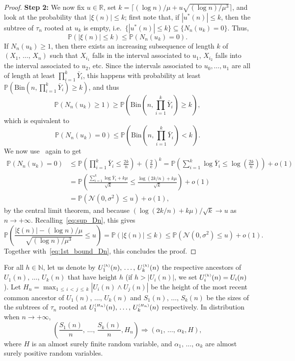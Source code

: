 \documentclass[AHL,Unicode,longabstracts,published]{cedram}
\newcommand{\sss}{\ensuremath{\scriptscriptstyle}}
\newcommand{\bbP}{\mathbb{P}}
\newcommand{\bbN}{\mathbb{N}}
\newcommand{\bbR}{\mathbb{R}}
\newcommand{\clN}{\mathcal{N}}
\newcommand{\Bin}{\mathrm{Bin}}
\newcommand{\rme}{\mathrm{e}}
\begin{document}
\begin{proof}
{\bf Step 2:} We now fix $u\in\bbR$, set $k = \lceil(\log n)/\mu + u\sqrt{(\log n)/\mu^3}\rceil$, and look at the probability that $|\xi(n)|\leq k$; first note that, if $|u^*(n)| \leq k$, then the subtree of $\tau_n$ rooted at $u_k$ is empty, i.e.\ $\{|u^*(n)|\leq k\}\subseteq \{N_n(u_k)=0\}$. Thus,
\begin{equation}\label{eq:sup_Dn}
\bbP(|\xi(n)|\leq k)\leq \bbP(N_n(u_k)=0).
\end{equation}
If $N_n(u_k) \geq 1$, then there exists an increasing subsequence of length $k$ of $(X_1, \,\ldots,\, X_n)$ such that $X_{i_1}$ falls in the interval associated to $u_1$, $X_{i_2}$ falls into the interval associated to $u_2$, etc. Since the intervals associated to $u_0, \ldots, u_1$ are all of length at least $\prod_{i=1}^k \bar Y_i$, this happens with probability at least $\bbP(\Bin(n,\prod_{i=1}^k \bar Y_i)\geq k)$, and thus
\[
\bbP(N_n(u_k)\geq 1)
\geq \bbP\left(\Bin\left(n,\prod_{i=1}^k \bar Y_i\right)\geq k\right),
\]
which is equivalent to
\[
\bbP(N_n(u_k)=0) \leq \bbP\left(\Bin\left(n,\prod_{i=1}^k \bar Y_i\right)< k\right).
\]
We now use~\cite[Lemma~4]{devroye-split} again to get
\begin{align*}
\bbP(N_n(u_k)=0) &\leq \bbP\left(\prod_{i=1}^k \bar Y_i\leq \frac{2k}n\right)+\left(\frac2{\rme}\right)^k =\bbP\left(\sum_{i=1}^k \log \bar Y_i\leq \log\left(\frac{2k}n\right)\right)+o(1)\\
&= \bbP\left(\frac{\sum_{i=1}^k \log \bar Y_i+k\mu}{\sqrt{k}}\leq \frac{\log(2k/n)+k\mu}{\sqrt k}\right)+o(1)\\
&=\bbP(\clN(0,\sigma^2)\leq u)+o(1),
\end{align*}
by the central limit theorem, and because $(\log(2k/n)+k\mu)/\sqrt k\to u$ as $n\to+\infty$. Recalling~\eqref{eq:sup_Dn}, this gives
\[
\bbP\left(\frac{|\xi(n)|-(\log n)/\mu}{\sqrt{(\log n)/\mu^3}}\leq u\right)=\bbP(|\xi(n)|\leq k)
\leq \bbP(\clN(0,\sigma^2)\leq u)+o(1).
\]
Together with~\eqref{eq:1st_bound_Dn}, this concludes the proof.
\end{proof}

\begin{lemm}\label{lem:LCA}
For all $h\in \bbN$, let us denote by $U^{\sss (h)}_1(n), \,\ldots,\, U^{\sss (h)}_k(n)$ the respective ancestors of $U_1(n), \,\ldots,\, U_k(n)$ that have height $h$ (if $h>|U_i(n)|$, we set $U^{\sss (h)}_i(n)=U_i(n)$). Let $H_n=\max_{1\,\le\,i\,<\,j\,\le\,k} |U_i(n)\wedge U_j(n)|$ be the height of the most recent common ancestor of $U_1(n),\,\dots,\,U_k(n)$ and $S_1(n), \,\ldots, \,S_k(n)$ be the sizes of the subtrees of $\tau_n$ rooted at $U_1^{\sss (H_n)}(n), \,\ldots,\, U_k^{\sss (H_n)}(n)$ respectively. In distribution when $n\to+\infty$,
\[
\left(\frac{S_1(n)}n, \,\ldots,\, \frac{S_k(n)}n, H_n\right)
\Rightarrow (\alpha_1, \,\ldots,\, \alpha_k, H),
\]
where $H$ is an almost surely finite random variable, and $\alpha_1,\, \ldots,\, \alpha_k$ are almost surely positive random variables.
\end{lemm}
\end{document}

